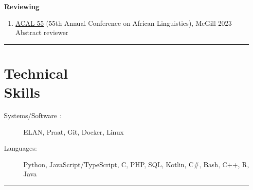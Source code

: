 \documentclass[margin,line]{resume}
\begin{document}
\begin{resume}

	\textbf{Reviewing}
	\begin{enumerate}[-, leftmargin=1em, topsep=2pt]

		\item[] \href{https://acal55.mull-lab.org/}{ACAL 55} (55th Annual Conference on African Linguistics), McGill \hfill 2023\\
		      \hphantom{...}Abstract reviewer
	\end{enumerate}

\newpage

	\rule{\textwidth}{0.4pt}



	\vspace{-1em}

	\section{\mysidestyle Technical\\Skills}\vspace{2mm}
	\begin{description}
		\item[Systems/Software%
		:] ELAN, Praat, %
		Git, Docker, Linux%
		\item[Languages:] Python, %
		JavaScript/TypeScript, C, PHP, SQL, Kotlin, C\#, Bash, C++, R, Java
	\end{description}


	\vspace{-2em}\rule{\textwidth}{0.4pt}


\end{resume}
\end{document}
